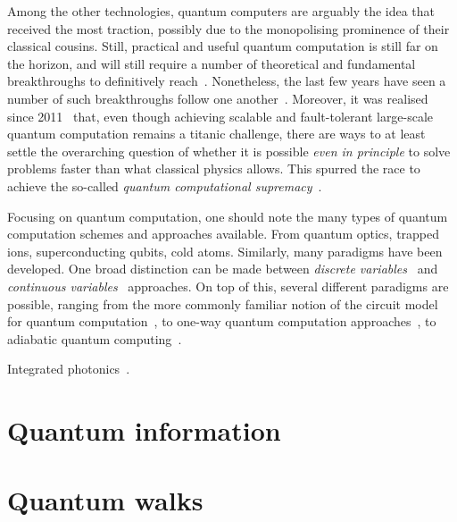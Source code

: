 Among the other technologies, quantum computers are arguably the idea that received the most traction, possibly due to the monopolising prominence of their classical cousins.
Still, practical and useful quantum computation is still far on the horizon, and will still require a number of theoretical and fundamental breakthroughs to definitively reach~\cite{preskill2018quantum,flamini2018photonic,wang2019integrated}.
Nonetheless, the last few years have seen a number of such breakthroughs follow one another~\cite{fowler2012surface,barends2014superconducting,córcoles2015demonstration,ofek2016extending,arute2019quantum}.
Moreover, it was realised since 2011~\cite{aaronson2011computational} that, even though achieving scalable and fault-tolerant large-scale quantum computation remains a titanic challenge, there are ways to at least settle the overarching question of whether it is possible \textit{even in principle} to solve problems faster than what classical physics allows. This spurred the race to achieve the so-called \textit{quantum computational supremacy}~\cite{preskill2012quantum,gross2013the,aaronson2011computational,bremner2016average,boixo2018characterizing,bouland2018complexity,aaronson2017complexity,neill2018blueprint,arute2019quantum}.

Focusing on quantum computation, one should note the many types of quantum computation schemes and approaches available. From quantum optics, trapped ions, superconducting qubits, cold atoms.
Similarly, many paradigms have been developed. One broad distinction can be made between \textit{discrete variables}~\cite{walmsley2005applied,andersen2015hybrid} and \textit{continuous variables}~\cite{lloyd1999quantum,braunstein2005quantum} approaches.
On top of this, several different paradigms are possible, ranging from the more commonly familiar notion of the circuit model for quantum computation~\cite{nielsen2006quantum}, to one-way quantum computation approaches~\cite{raussendorf2001one,walther2005experimental,browne2006one}, to adiabatic quantum computing~\cite{aharonov2004adiabatic,albash2018adiabatic}.

Integrated photonics~\cite{wang2019integrated,flamini2018photonic}.

\section{Quantum information}

\section{Quantum walks}

